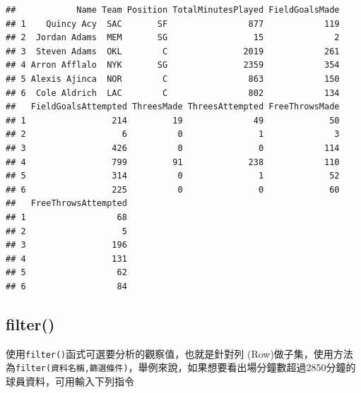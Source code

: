 \documentclass[]{book}
\newenvironment{Shaded}{\begin{snugshade}}{\end{snugshade}}
\newcommand{\KeywordTok}[1]{\textcolor[rgb]{0.13,0.29,0.53}{\textbf{{#1}}}}
\newcommand{\DecValTok}[1]{\textcolor[rgb]{0.00,0.00,0.81}{{#1}}}
\newcommand{\NormalTok}[1]{{#1}}
\theoremstyle{definition}
\theoremstyle{definition}
\theoremstyle{remark}
\begin{document}
\begin{verbatim}
##            Name Team Position TotalMinutesPlayed FieldGoalsMade
## 1    Quincy Acy  SAC       SF                877            119
## 2  Jordan Adams  MEM       SG                 15              2
## 3  Steven Adams  OKL        C               2019            261
## 4 Arron Afflalo  NYK       SG               2359            354
## 5 Alexis Ajinca  NOR        C                863            150
## 6  Cole Aldrich  LAC        C                802            134
##   FieldGoalsAttempted ThreesMade ThreesAttempted FreeThrowsMade
## 1                 214         19              49             50
## 2                   6          0               1              3
## 3                 426          0               0            114
## 4                 799         91             238            110
## 5                 314          0               1             52
## 6                 225          0               0             60
##   FreeThrowsAttempted
## 1                  68
## 2                   5
## 3                 196
## 4                 131
## 5                  62
## 6                  84
\end{verbatim}

\subsection{filter()}\label{filter}

使用\texttt{filter()}函式可選要分析的觀察值，也就是針對列
(Row)做子集，使用方法為\texttt{filter(資料名稱,篩選條件)}，舉例來說，如果想要看出場分鐘數超過2850分鐘的球員資料，可用輸入下列指令

\begin{Shaded}
\end{Shaded}
\end{document}
